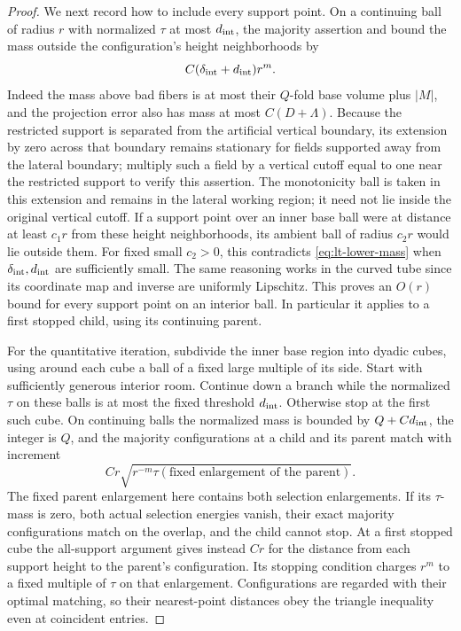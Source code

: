 \begin{proof}
We next record how to include every support point.  On a continuing ball
of radius $r$ with normalized $\tau$ at most $d_{\rm int}$, the majority
assertion and  bound the mass outside the
configuration's height neighborhoods by
\[
 C(\delta_{\rm int}+d_{\rm int})r^m.
\]
Indeed the mass above bad fibers is at most their $Q$-fold base volume plus
$|M|$, and the projection error also has mass at most $C(D+\Lambda)$.
Because the restricted support is separated from the artificial vertical
boundary, its extension by zero across that boundary remains stationary
for fields supported away from the lateral boundary; multiply such a field
by a vertical cutoff equal to one near the restricted support to verify
this assertion.  The monotonicity ball is taken in this extension and
remains in the lateral working region; it need not lie inside the original
vertical cutoff.  If a support point over an inner base ball were at
distance at least $c_1r$ from these height neighborhoods, its ambient ball
of radius $c_2r$ would lie outside them.  For fixed small
$c_2>0$, this contradicts \eqref{eq:lt-lower-mass} when
$\delta_{\rm int},d_{\rm int}$ are
sufficiently small.  The same reasoning works in the curved tube since its
coordinate map and inverse are uniformly Lipschitz.  This proves an
$O(r)$ bound for every support point on an interior ball.  In particular
it applies to a first stopped child, using its continuing parent.

For the quantitative iteration, subdivide the inner base region into
dyadic cubes, using around each cube a ball of a fixed large multiple of
its side.  Start with sufficiently generous interior room.  Continue down
a branch while the normalized $\tau$ on these balls is at most the fixed
threshold $d_{\rm int}$.  Otherwise stop at the first such cube.  On continuing
balls the normalized mass is bounded by $Q+Cd_{\rm int}$, the integer is $Q$, and
the majority configurations at a child and its parent match with increment
\[
 Cr\sqrt{r^{-m}\tau(\text{fixed enlargement of the parent})}.
\]
The fixed parent enlargement here contains both selection enlargements.
If its $\tau$-mass is zero, both actual selection energies vanish, their
exact majority configurations match on the overlap, and the child cannot stop.
At a first stopped cube the all-support argument gives instead $Cr$ for
the distance from each support height to the parent's configuration.  Its
stopping condition charges $r^m$ to a fixed multiple of $\tau$ on that
enlargement.  Configurations are regarded with their optimal matching, so
their nearest-point distances obey the triangle inequality even at
coincident entries.


\end{proof}
